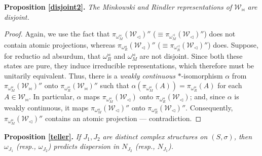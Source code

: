 \documentclass[12pt]{article}
\theoremstyle{remark}
\theoremstyle{definition}
\newcommand{\alg}[1]{\mathcal{#1}}
\begin{document}
 \noindent \textbf{Proposition \ref{disjoint2}.} 
\emph{The Minkowski and Rindler representations of
  $\alg{W}_{\bowtie}$ are disjoint.}  

\begin{proof}  Again, we use the fact that  $\pi
  _{\omega _{M}^{\bowtie}}(\alg{W}_{\triangleleft})''$ 
  ($\equiv\pi _{\omega 
  _{M}^{\triangleleft}}(\alg{W}_{\triangleleft})''$) does not 
  contain atomic projections, whereas 
  $\pi_{\omega _{R}^{\bowtie}}(\alg{W}_{\triangleleft})''$ 
  ($\equiv\pi_{\omega _{R}^{\triangleleft}}(\alg{W}_{\triangleleft})''$) does.  
  Suppose, for reductio ad absurdum, that 
$\omega_{R}^{\bowtie}$ and $\omega _{M}^{\bowtie}$ are not disjoint.  
Since both these states are pure, they induce irreducible
representations, which therefore must be unitarily equivalent.  
Thus, there is a \emph{weakly 
continuous} $*$-isomorphism
  $\alpha$ from $\pi _{\omega _{M}^{\bowtie}}(\alg{W}_{\bowtie})''$ onto $\pi
  _{\omega_{R}^{\bowtie}}(\alg{W}_{\bowtie})''$ such 
that $\alpha (\pi _{\omega _{M}^{\bowtie}}(A))=\pi
  _{\omega_{R}^{\bowtie}}(A)$ for each $A\in 
\alg{W}_{\bowtie}$.  In particular,
  $\alpha$ maps $\pi _{\omega _{M}^{\bowtie}}(\alg{W}_{\triangleleft})$ onto 
  $\pi_{\omega_{R}^{\bowtie}}
  (\alg{W}_{\triangleleft})$; and, 
since $\alpha$ is weakly continuous, it
  maps $\pi _{\omega _{M}^{\bowtie}}(\alg{W}_{\triangleleft})''$ onto 
  $\pi_{\omega_{R}^{\bowtie}}(\alg{W}_{\triangleleft})''$.  Consequently, $\pi
  _{\omega _{M}^{\bowtie}}(\alg{W}_{\triangleleft})''$ contains an atomic projection --- 
  contradiction.  \end{proof} 
  
  \noindent \textbf{Proposition \ref{teller}.} \emph{If $J_{1},J_{2}$ are distinct complex structures on 
$(S,\sigma )$, then $\omega _{J_{1}}$ (resp., $\omega _{J_{2}}$) predicts 
dispersion in $N_{J_{2}}$ (resp., $N_{J_{1}}$).} 
\end{document}
